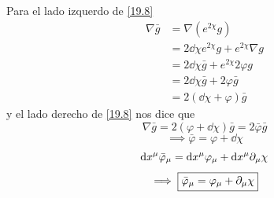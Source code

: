 Para el lado izquerdo de \eqref{19.8}
\begin{align}
  \nabla\bar{g}&=\nabla(e^{2\chi }g)\\
  &=2\dd \chi e^{2\chi }g+e^{2\chi }\nabla g\\
  &=2\dd \chi \bar{g}+e^{2\chi }2\varphi g\\
  &=2\dd \chi \bar{g}+2\varphi \bar{g}\\
  &=2(\dd\chi +\varphi)\bar{g}
\end{align}
y el lado derecho de \eqref{19.8} nos dice que
\begin{equation}
  \nabla\bar{g}=2(\varphi +\dd\chi )\bar{g}=2\bar{\varphi}\bar{g}
\end{equation}
\begin{equation}
  \implies\boxed{ \bar{\varphi}=\varphi+\dd\chi}
\end{equation}
\begin{equation}
  \dd x^\mu \bar{\varphi}_\mu =\dd x^\mu \varphi_\mu +\dd x^\mu \partial_\mu \chi 
\end{equation}
\begin{equation}
  \implies \boxed{\bar{\varphi}_\mu =\varphi_\mu +\partial_\mu \chi }
\end{equation}



















































